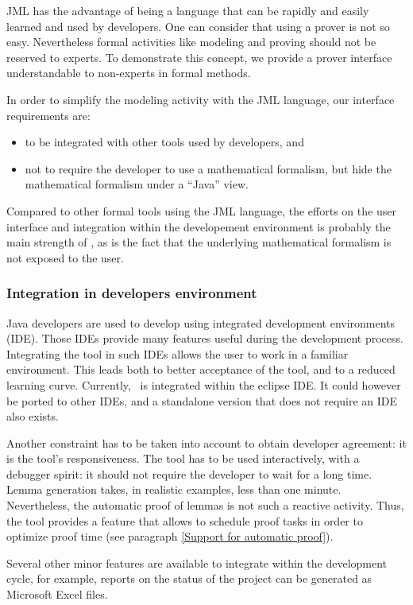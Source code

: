 \label{Industrialisation}
JML has the advantage of being a language that can be rapidly and
easily learned and used by developers. One can consider that using a
prover is not so easy. Nevertheless formal activities like modeling
and proving should not be reserved to experts. To demonstrate this
concept, we provide a prover interface understandable to non-experts
in formal methods.

In order to simplify the modeling activity with the JML language, our
interface requirements are:
\begin{itemize}
 \item to be integrated with other tools used by developers, and
 \item not to require the developer to use a mathematical formalism,
    but hide the mathematical formalism under a ``Java'' view.
\end{itemize}
Compared to other formal tools using the JML language, the efforts on
the user interface and integration within the developement
environment is probably the main strength of \JACK, as is the fact
that the underlying mathematical formalism is not exposed to the
user.
\subsubsection{Integration in developers environment}
 Java developers are used to develop using integrated development
environments (IDE).  Those IDEs provide many features useful during
the development process.  Integrating the tool in such IDEs allows the
user to work in a familiar environment.  This leads both to better
acceptance of the tool, and to a reduced learning curve.  Currently,
\JACK\ is integrated within the eclipse IDE.  It could however be ported
to other IDEs, and a standalone version that does not require an IDE
also exists.

 Another constraint has to be taken into account to obtain developer
 agreement: it is the tool's responsiveness.  The tool has to be used interactively, with a
 debugger spirit: it should not require the developer to wait for a
 long time.  Lemma generation takes, in realistic examples, less
 than one minute. %
 Nevertheless, the automatic proof of lemmas is not such a  reactive
 activity. Thus, the tool provides a feature that allows to schedule proof
 tasks in order to optimize proof time (see paragraph \ref{Support for
 automatic proof}).


Several other minor features are available to integrate within the
development cycle, for example, reports on the status of the project
can be generated as Microsoft Excel files.
